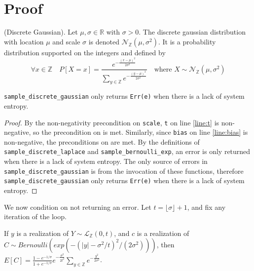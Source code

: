 \documentclass{article}
\begin{document}
\section{Proof}

\begin{definition}
    (Discrete Gaussian). \cite{CKS20} Let $\mu, \sigma \in \mathbb{R}$ with $\sigma > 0$. 
    The discrete gaussian distribution with location $\mu$ and scale $\sigma$ is denoted $\mathcal{N}_\mathbb{Z}(\mu, \sigma^2)$. 
    It is a probability distribution supported on the integers and defined by
    \begin{equation*}
        \forall x \in \mathbb{Z} \quad  P[X = x] = \frac{e^{-\frac{(x - \mu)^2}{2\sigma^2}}}{\sum_{y\in\mathbb{Z}}e^{-\frac{(y - \mu)^2}{2\sigma^2}}} \quad \text{where } X \sim \mathcal{N}_\mathbb{Z}(\mu, \sigma^2)
    \end{equation*}
\end{definition}


\begin{lemma}
    \label{err-e}
    \texttt{sample\_discrete\_gaussian} only returns \texttt{Err(e)} when there is a lack of system entropy.
\end{lemma}

\begin{proof}
    By the non-negativity precondition on \texttt{scale}, \texttt{t} on line \ref{line:t} is non-negative, 
    so the precondition on  is met.
    Similarly, since \texttt{bias} on line \ref{line:bias} is non-negative, the preconditions on  are met.
    By the definitions of \texttt{sample\_discrete\_laplace} and \texttt{sample\_bernoulli\_exp}, an error is only returned when there is a lack of system entropy.
    The only source of errors in \texttt{sample\_discrete\_gaussian} is from the invocation of these functions,
    therefore \texttt{sample\_discrete\_gaussian} only returns \texttt{Err(e)} when there is a lack of system entropy.
\end{proof}

We now condition on not returning an error.
Let $t = \lfloor \sigma \rfloor + 1$, and fix any iteration of the loop. 

\begin{lemma}\cite{CKS20}
    \label{E_C}
    If $y$ is a realization of $Y \sim \mathcal{L}_\mathbb{Z}(0, t)$, and $c$ is a realization of $C \sim Bernoulli(exp(-(|y| - \sigma^2 / t)^2 / (2 \sigma^2)))$, then
    $E[C] = \frac{1 - e^{-1/\sigma}}{1 + e^{-1/\sigma}}e^{-\frac{\sigma^2}{2t^2}} \sum_{y\in \mathbb{Z}} e^{-\frac{y^2}{2\sigma^2}}$.
\end{lemma}
\end{document}
